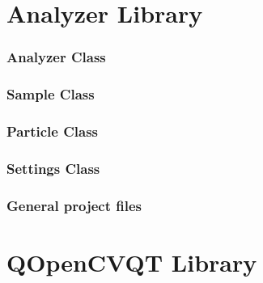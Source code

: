 \documentclass[11pt,fleqn,,a4paper,twoside,openright]{book}
\begin{document}
\chapter{Analyzer Library}
\subsection*{Analyzer Class}


\newpage
\subsection*{Sample Class}


\newpage
\subsection*{Particle Class}


\newpage
\subsection*{Settings Class}


\newpage
\subsection*{General project files}




\newpage

\chapter{QOpenCVQT Library}



\newpage
\end{document}
